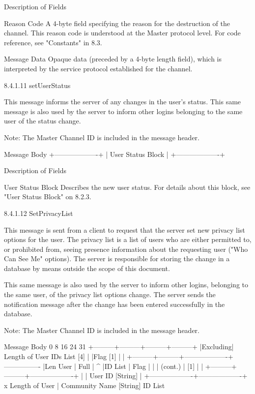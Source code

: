 \documentclass[titlepage,oneside]{book}
\begin{document}
Description of Fields

Reason Code
  A 4-byte field specifying the reason for the destruction of the
  channel. This reason code is understood at the Master protocol level.
  For code reference, see "Constants" in 8.3.

Message Data
  Opaque data (preceded by a 4-byte length field), which is
  interpreted by the service protocol established for the channel.

8.4.1.11 setUserStatus

This message informs the server of any changes in the user's status.
This same message is also used by the server to inform other logins
belonging to the same user of the status change.

Note: The Master Channel ID is included in the message header.

Message Body
+-------------------+
| User Status Block |
+-------------------+

Description of Fields

User Status Block
  Describes the new user status. For details about this block, see
  "User Status Block" on 8.2.3.

8.4.1.12 SetPrivacyList

This message is sent from a client to request that the server set new
privacy list options for the user. The privacy list is a list of users
who are either permitted to, or prohibited from, seeing presence
information about the requesting user ("Who Can See Me" options). The
server is responsible for storing the change in a database by means
outside the scope of this document.

This same message is also used by the server to inform other logins,
belonging to the same user, of the privacy list options change. The
server sends the notification message after the change has been
entered successfully in the database.

Note: The Master Channel ID is included in the message header.

Message Body
0         8         16        24      31
+---------+---------+---------+---------+
|Excluding| Length of User IDs List [4] |
|Flag [1] |                             |
+---------+---------+-------------------+  ----------------
|Len User |  Full   |                                     ^
|ID List  |  Flag   |                                     |
| (cont.) |   [1]   |                                     |
+---------+---------+-------------------+                 |
| User ID [String]                                        |
+-------------------+-------------------+      x Length of User
| Community Name [String]                           ID List
\end{document}
